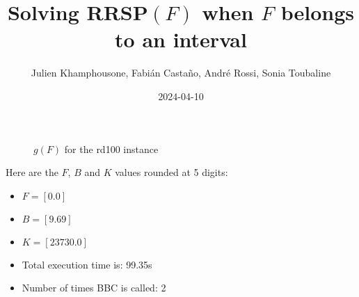 \documentclass{article}
\begin{document}
     \title{Solving RRSP$(F)$ when $F$ belongs to an interval}
     \author{Julien Khamphousone, Fabi\'an Casta\~no, Andr\'e Rossi, Sonia Toubaline}
     \date{2024-04-10}
     \maketitle
     \def\F{{0.0,0.0}}
\def\gF{{237.3,23730.0}}
\begin{figure}[ht!]
    \begin{center}
    \end{center}
    \vspace*{-2eM}
    \caption{$g(F)$ for the rd100 instance}\label{fig:1}
    \end{figure}
    Here are the $F$, $B$ and $K$ values rounded at 5 digits:

\begin{itemize}
	\item  $F = [0.0]$
 \item $B = [9.69]$
 \item  $K = [23730.0]$\item Total execution time is: 99.35s\item Number of times BBC is called: 2\end{itemize}
\end{document}
